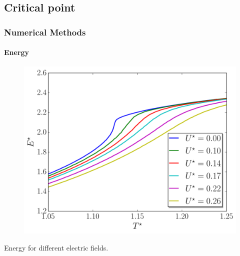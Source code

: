 \documentclass{beamer}
\begin{document}
\subsection{Critical point}
\begin{frame}
	\frametitle{Numerical Methods}
	\framesubtitle{Energy}

\begin{figure}
\includegraphics[scale=0.48]{figures/electricField_calo.pdf}
\end{figure}
\vspace{-0.6cm}
\center Energy for different electric fields.
\end{frame}
\end{document}
